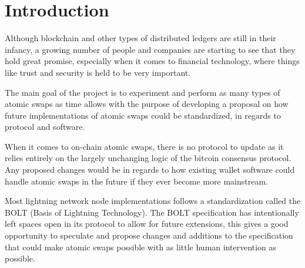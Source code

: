 
\chapter{Introduction}
Although blockchain and other types of distributed ledgers are still in their
infancy, a growing number of people and companies are starting to see that they
hold great promise, especially when it comes to financial technology, where
things like trust and security is held to be very important.







The main goal of the project is to experiment and perform as many types of atomic swaps
as time allows with the purpose of developing a proposal on how future implementations
of atomic swaps could be standardized, in regards to protocol and software.

When it comes to on-chain atomic swaps, there is no protocol to update as it relies
entirely on the largely unchanging logic of the bitcoin consensus protocol. Any
proposed changes would be in regards to how existing wallet software could handle
atomic swaps in the future if they ever become more mainstream.

Most lightning network node implementations follows a standardization called the BOLT
(Basis of Lightning Technology). The BOLT specification has intentionally left spaces
open in its protocol to allow for future extensions, this gives a good opportunity to
speculate and propose changes and additions to the specification that could make atomic
swaps possible with as little human intervention as possible.
